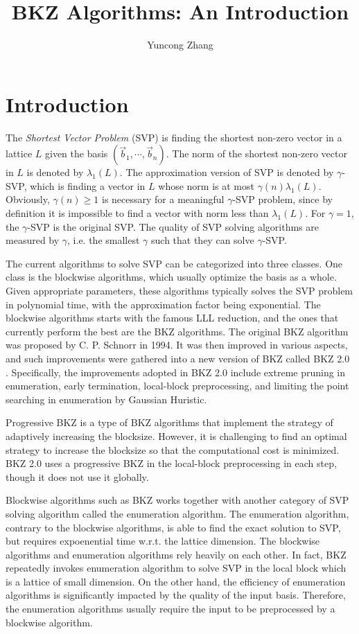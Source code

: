 \documentclass[11pt]{article}
\title{BKZ Algorithms: An Introduction}
\author{Yuncong Zhang}
\newcommand{\vb}{\vec{b}}
\begin{document}
\maketitle

\section{Introduction}

The \emph{Shortest Vector Problem} (SVP) is finding the shortest non-zero vector in a lattice $L$ given the basis $(\vb_1,\cdots,\vb_n)$.
The norm of the shortest non-zero vector in $L$ is denoted by $\lambda_1(L)$.
The approximation version of SVP is denoted by $\gamma$-SVP, which is finding a vector in $L$ whose norm is at most $\gamma(n)\lambda_1(L)$.
Obviously, $\gamma(n)\geq 1$ is necessary for a meaningful $\gamma$-SVP problem, since by definition it is impossible to find a vector with norm less than $\lambda_1(L)$.
For $\gamma=1$, the $\gamma$-SVP is the original SVP.
The quality of SVP solving algorithms are measured by $\gamma$, i.e. the smallest $\gamma$ such that they can solve $\gamma$-SVP.

The current algorithms to solve SVP can be categorized into three classes.
One class is the blockwise algorithms, which usually optimize the basis as a whole.
Given appropriate parameters, these algorithms typically solves the SVP problem in polynomial time, with the approximation factor being exponential.
The blockwise algorithms starts with the famous LLL reduction, and the ones that currently perform the best are the BKZ algorithms.
The original BKZ algorithm was proposed by C. P. Schnorr \cite{se1994lattice} in 1994.
It was then improved in various aspects, and such improvements were gathered into a new version of BKZ called BKZ 2.0 \cite{cn2011bkz}. Specifically, the improvements adopted in BKZ 2.0 include extreme pruning in enumeration, early termination, local-block preprocessing, and limiting the point searching in enumeration by Gaussian Huristic.

Progressive BKZ is a type of BKZ algorithms that implement the strategy of adaptively increasing the blocksize.
However, it is challenging to find an optimal strategy to increase the blocksize so that the computational cost is minimized.
BKZ 2.0 uses a progressive BKZ in the local-block preprocessing in each step, though it does not use it globally.

Blockwise algorithms such as BKZ works together with another category of SVP solving algorithm called the enumeration algorithm.
The enumeration algorithm, contrary to the blockwise algorithms, is able to find the exact solution to SVP, but requires expoenential time w.r.t. the lattice dimension.
The blockwise algorithms and enumeration algorithms rely heavily on each other.
In fact, BKZ repeatedly invokes enumeration algorithm to solve SVP in the local block which is a lattice of small dimension.
On the other hand, the efficiency of enumeration algorithms is significantly impacted by the quality of the input basis.
Therefore, the enumeration algorithms usually require the input to be preprocessed by a blockwise algorithm.
\end{document}
